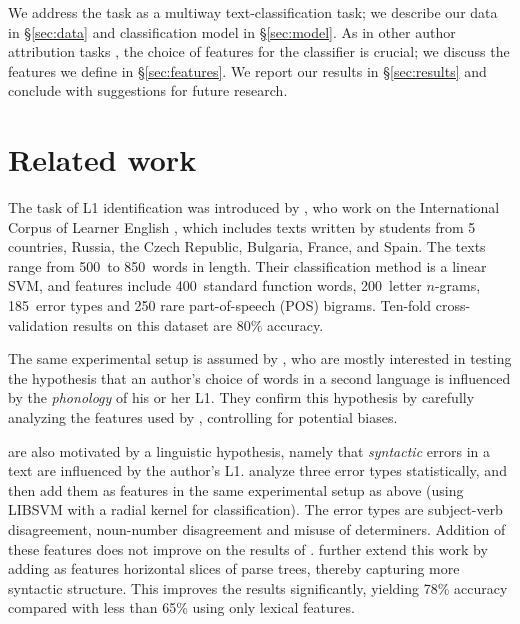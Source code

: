 \documentclass[11pt,letterpaper]{article}
\newcommand{\Sref}[1]{\S\ref{#1}}
\begin{document}
We address the task as a multiway text-classification task; we describe our data in \Sref{sec:data} and classification model in \Sref{sec:model}. As in other author
attribution tasks \citep{joula:2006}, the choice of features for the
classifier is crucial; we discuss the features we define in
\Sref{sec:features}. We report our results in
\Sref{sec:results} and conclude with suggestions for future
research.

\section{Related work}
\label{sec:literature}
The task of L1 identification was introduced by
\citet{koppel2005automatically,koppel2005determining}, who work on the
International Corpus of Learner English \citep{icle}, which includes
texts written by students from 5 countries, Russia, the Czech Republic, Bulgaria,
France, and Spain. The texts range from 500~to 850~words in length. Their
classification method is a linear SVM, and features include 400~standard function words, 200~letter $n$-grams, 185~error types and 250
rare part-of-speech (POS) bigrams. Ten-fold cross-validation results
on this dataset are 80\% accuracy.

The same experimental setup is assumed by
\citet{tsur-rappoport:2007:Cognitive-2007}, who are mostly interested
in testing the hypothesis that an author's choice of words in a second
language is influenced by the \emph{phonology} of his or her L1. They confirm
this hypothesis by carefully analyzing the features used by
\citeauthor{koppel2005automatically}, controlling for potential
biases.

\citet{Wong-Dras:2009:ALTA2009,wong-dras:2011:EMNLP} are also
motivated by a linguistic hypothesis, namely that \emph{syntactic} errors in
a text are influenced by the author's
L1. \citet{Wong-Dras:2009:ALTA2009} analyze three error types
statistically, and then add them as features in the same experimental
setup as above (using LIBSVM with a radial kernel for
classification). The error types are subject-verb disagreement,
noun-number disagreement and misuse of determiners. Addition of these
features does not improve on the results of
\citeauthor{koppel2005automatically}. \citet{wong-dras:2011:EMNLP}
further extend this work by adding as features horizontal slices of
parse trees, thereby capturing more syntactic structure. This improves
the results significantly, yielding 78\% accuracy compared with less
than 65\% using only lexical features.
\end{document}
